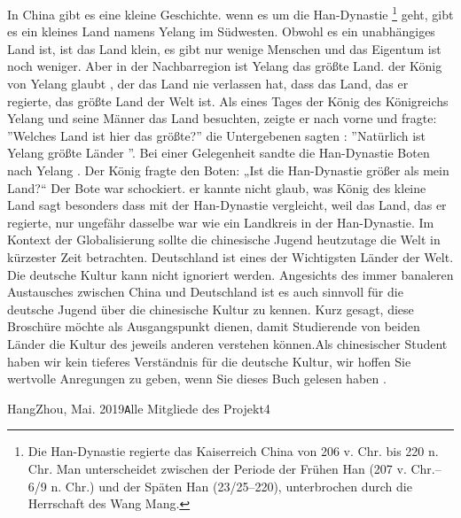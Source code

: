 \mypar
In China gibt es eine kleine Geschichte. wenn es um die Han-Dynastie \footnote{Die Han-Dynastie regierte das Kaiserreich China von 206 v. Chr. bis 220 n. Chr. Man unterscheidet zwischen der Periode der Frühen Han (207 v. Chr.–6/9 n. Chr.) und der Späten Han (23/25–220), unterbrochen durch die Herrschaft des Wang Mang. } geht, gibt es ein kleines Land namens Yelang im Südwesten. Obwohl es ein unabhängiges Land ist, ist das Land klein, es gibt nur wenige Menschen und das Eigentum ist noch weniger. Aber in der  Nachbarregion ist Yelang das grö\ss te Land. der König von Yelang glaubt , der das Land nie verlassen hat, dass das Land, das er regierte, das grö\ss te Land der Welt ist. Als eines Tages der König des Königreichs Yelang und seine Männer das Land besuchten, zeigte er nach vorne und fragte: ''Welches Land ist hier das grö\ss te?'' die Untergebenen sagten : ''Natürlich ist Yelang grö\ss te L\"ander ''.   Bei einer Gelegenheit sandte die Han-Dynastie Boten nach Yelang . Der König fragte den Boten: „Ist die Han-Dynastie grö\ss er als mein Land?“ Der Bote war schockiert. er kannte nicht glaub, was König des kleine Land sagt besonders dass mit der Han-Dynastie vergleicht, weil das Land, das er regierte, nur ungefähr dasselbe war wie ein Landkreis in der Han-Dynastie. Im Kontext der Globalisierung sollte die chinesische Jugend heutzutage die Welt in kürzester Zeit betrachten. Deutschland ist eines der Wichtigsten Länder der Welt. Die deutsche Kultur kann nicht ignoriert werden. Angesichts des immer banaleren Austausches zwischen China und Deutschland ist es auch sinnvoll f\"ur die deutsche Jugend über die chinesische Kultur zu kennen. Kurz gesagt, diese Broschüre möchte als Ausgangspunkt dienen, damit Studierende von beiden  L\"ander die Kultur des jeweils anderen verstehen können.Als chinesischer Student haben wir kein tieferes Verständnis für die deutsche Kultur, wir hoffen Sie wertvolle Anregungen zu geben, wenn Sie dieses Buch gelesen haben .
\vspace{\baselineskip}
\begin{flushright}\noindent
HangZhou, Mai.  2019\hfill {\texttt Alle Mitgliede des Projekt4}\\
\end{flushright}
